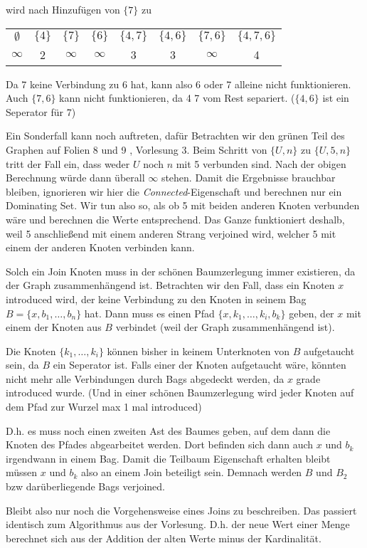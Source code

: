 wird nach Hinzufügen von $\{7\}$ zu

\begin{center}
\begin{tabular}{c c c c c c c c}
    $\emptyset$ & $\{4\}$ & $\{7\}$ & $\{6\}$ & $\{4,7\}$ &$\{4,6\}$ &$\{7,6\}$ &$\{4,7,6\}$\\
    $\infty$ & 2 & $\infty$ & $\infty$ & 3 & 3 & $\infty$ & 4\\
\end{tabular}
\end{center}

Da 7 keine Verbindung zu 6 hat, kann also 6 oder 7 alleine nicht funktionieren. Auch $\{7,6\}$ kann nicht funktionieren, da 4 7 vom Rest separiert. ($\{4,6\}$ ist ein Seperator für 7)

Ein Sonderfall kann noch auftreten, dafür Betrachten wir den grünen Teil des Graphen auf Folien 8 und 9 , Vorlesung 3.
Beim Schritt von $\{U,n\}$ zu $\{U,5,n\}$ tritt der Fall ein, dass weder $U$ noch $n$ mit 5 verbunden sind. Nach der obigen Berechnung würde dann überall $\infty$ stehen.
Damit die Ergebnisse brauchbar bleiben, ignorieren wir hier die \emph{Connected}-Eigenschaft und berechnen nur ein Dominating Set. Wir tun also so, als ob 5 mit beiden anderen Knoten verbunden wäre und berechnen die Werte entsprechend.
Das Ganze funktioniert deshalb, weil 5 anschließend mit einem anderen Strang verjoined wird, welcher 5 mit einem der anderen Knoten verbinden kann.

Solch ein Join Knoten muss in der schönen Baumzerlegung immer existieren, da der Graph zusammenhängend ist.
Betrachten wir den Fall, dass ein Knoten $x$ introduced wird, der keine Verbindung zu den Knoten in seinem Bag $B = \{x, b_1, \dots , b_n\}$ hat.
Dann muss es einen Pfad $\{x, k_1, \dots, k_i, b_k\}$ geben, der $x$ mit einem der Knoten aus $B$ verbindet (weil der Graph zusammenhängend ist).

Die Knoten $\{k_1, \dots, k_i\}$ können bisher in keinem Unterknoten von $B$ aufgetaucht sein, da $B$ ein Seperator ist. Falls einer der Knoten aufgetaucht wäre, könnten nicht mehr alle Verbindungen durch Bags abgedeckt werden, da $x$ grade introduced wurde. (Und in einer schönen Baumzerlegung wird jeder Knoten auf dem Pfad zur Wurzel max 1 mal introduced)

D.h. es muss noch einen zweiten Ast des Baumes geben, auf dem dann die Knoten des Pfades abgearbeitet werden. Dort befinden sich dann auch $x$ und $b_k$ irgendwann in einem Bag. Damit die Teilbaum Eigenschaft erhalten bleibt müssen $x$ und $b_k$ also an einem Join beteiligt sein. Demnach werden $B$ und $B_2$ bzw darüberliegende Bags verjoined.

Bleibt also nur noch die Vorgehensweise eines Joins zu beschreiben. Das passiert identisch zum Algorithmus aus der Vorlesung.
D.h. der neue Wert einer Menge berechnet sich aus der Addition der alten Werte minus der Kardinalität.



